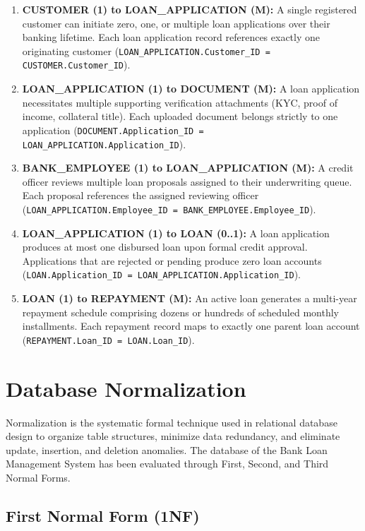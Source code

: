 \documentclass[12pt,a4paper,oneside]{report}
\begin{document}
\begin{enumerate}
  \item \textbf{CUSTOMER (1) to LOAN\_APPLICATION (M):} A single registered customer can initiate zero, one, or multiple loan applications over their banking lifetime. Each loan application record references exactly one originating customer (\texttt{LOAN\_APPLICATION.Customer\_ID = CUSTOMER.Customer\_ID}).
  \item \textbf{LOAN\_APPLICATION (1) to DOCUMENT (M):} A loan application necessitates multiple supporting verification attachments (KYC, proof of income, collateral title). Each uploaded document belongs strictly to one application (\texttt{DOCUMENT.Application\_ID = LOAN\_APPLICATION.Application\_ID}).
  \item \textbf{BANK\_EMPLOYEE (1) to LOAN\_APPLICATION (M):} A credit officer reviews multiple loan proposals assigned to their underwriting queue. Each proposal references the assigned reviewing officer (\texttt{LOAN\_APPLICATION.Employee\_ID = BANK\_EMPLOYEE.Employee\_ID}).
  \item \textbf{LOAN\_APPLICATION (1) to LOAN (0..1):} A loan application produces at most one disbursed loan upon formal credit approval. Applications that are rejected or pending produce zero loan accounts (\texttt{LOAN.Application\_ID = LOAN\_APPLICATION.Application\_ID}).
  \item \textbf{LOAN (1) to REPAYMENT (M):} An active loan generates a multi-year repayment schedule comprising dozens or hundreds of scheduled monthly installments. Each repayment record maps to exactly one parent loan account (\texttt{REPAYMENT.Loan\_ID = LOAN.Loan\_ID}).
\end{enumerate}

\section{Database Normalization}

Normalization is the systematic formal technique used in relational database design to organize table structures, minimize data redundancy, and eliminate update, insertion, and deletion anomalies. The database of the Bank Loan Management System has been evaluated through First, Second, and Third Normal Forms.

\subsection{First Normal Form (1NF)}
\end{document}
